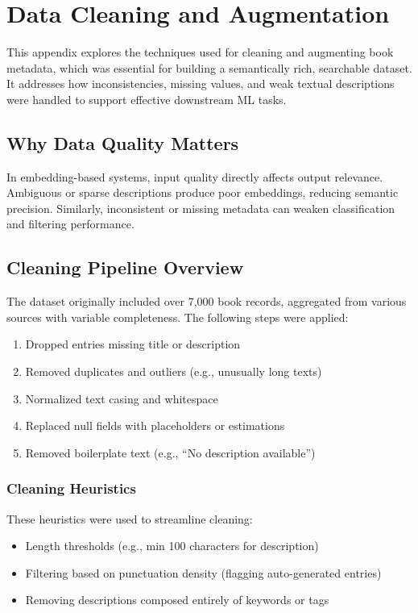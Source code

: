 \chapter{Data Cleaning and Augmentation}
\label{appendix:data-cleaning}

This appendix explores the techniques used for cleaning and augmenting book metadata, which was essential for building a semantically rich, searchable dataset. It addresses how inconsistencies, missing values, and weak textual descriptions were handled to support effective downstream ML tasks.

\section{Why Data Quality Matters}
In embedding-based systems, input quality directly affects output relevance. Ambiguous or sparse descriptions produce poor embeddings, reducing semantic precision. Similarly, inconsistent or missing metadata can weaken classification and filtering performance.

\section{Cleaning Pipeline Overview}
The dataset originally included over 7,000 book records, aggregated from various sources with variable completeness. The following steps were applied:

\begin{enumerate}
    \item Dropped entries missing title or description
    \item Removed duplicates and outliers (e.g., unusually long texts)
    \item Normalized text casing and whitespace
    \item Replaced null fields with placeholders or estimations
    \item Removed boilerplate text (e.g., “No description available”)
\end{enumerate}

\subsection*{Cleaning Heuristics}
These heuristics were used to streamline cleaning:
\begin{itemize}
    \item Length thresholds (e.g., min 100 characters for description)
    \item Filtering based on punctuation density (flagging auto-generated entries)
    \item Removing descriptions composed entirely of keywords or tags
\end{itemize}

